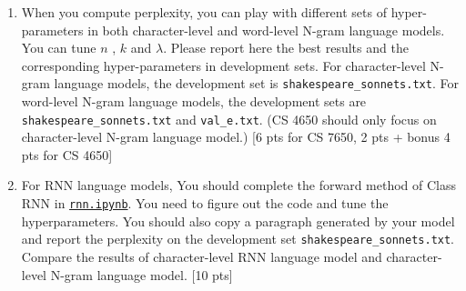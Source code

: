 \begin{enumerate}
    \item When you compute perplexity, you can play with different sets of hyper-parameters in both character-level and word-level N-gram language models. You can tune $n$ , $k$ and $\lambda$. Please report here the best results and the corresponding hyper-parameters in development sets. For character-level N-gram language models, the development set is \texttt{shakespeare\_sonnets.txt}. For word-level N-gram language models, the development sets are \texttt{shakespeare\_sonnets.txt} and \texttt{val\_e.txt}. (CS 4650 should only focus on character-level N-gram language model.) [6 pts for CS 7650, 2 pts + bonus 4 pts for CS 4650]
    
    \item For RNN language models, You should complete the forward method of Class RNN in  \href{https://www.cc.gatech.edu/classes/AY2020/cs7650_spring/hw3/lm/rnn.zip} {\texttt{rnn.ipynb}}. You need to figure out the code and tune the hyperparameters. You should also copy a paragraph generated by your model and report the perplexity on the development set \texttt{shakespeare\_sonnets.txt}. Compare the results of character-level RNN language model and character-level N-gram language model. [10 pts]

\end{enumerate}


